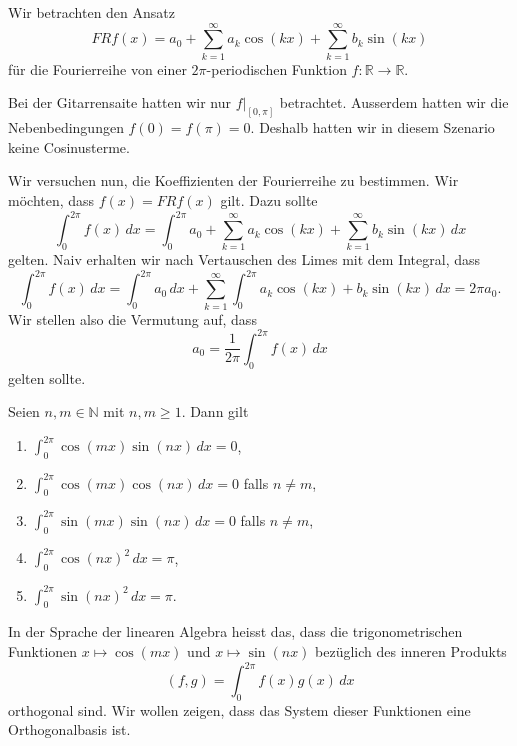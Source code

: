 \documentclass[../main.tex]{subfiles}
\begin{document}
Wir betrachten den Ansatz
\[
  FR f(x) = a_0 + \sum_{k=1}^{\infty} a_k \cos(kx)
  + \sum_{k=1}^{\infty} b_k \sin(kx)
\]
für die Fourierreihe von einer
$2\pi$-periodischen Funktion $f \colon \mathbb{R} \to \mathbb{R}$.

\begin{remark}
  Bei der Gitarrensaite hatten wir nur
  $f|_{[0, \pi]}$ betrachtet. Ausserdem hatten wir die
  Nebenbedingungen $f(0) = f(\pi) = 0$.
  Deshalb hatten wir in diesem Szenario keine Cosinusterme.
\end{remark}

Wir versuchen nun, die Koeffizienten der Fourierreihe zu bestimmen.
Wir möchten, dass $f(x) = FR f(x)$ gilt. Dazu sollte
\[
  \int_{0}^{2\pi} f(x) \, dx 
  = \int_{0}^{2\pi} a_0 +  \sum_{k=1}^{\infty} a_k \cos(kx)
  + \sum_{k=1}^{\infty} b_k \sin(kx)
  \, dx
\]
gelten. Naiv erhalten wir nach Vertauschen des Limes mit dem Integral, dass
\[
  \int_{0}^{2\pi} f(x) \, dx =
  \int_{0}^{2\pi} a_0 \, dx + \sum_{k=1}^{\infty} \int_{0}^{2\pi} a_k \cos (kx)
  + b_k \sin(kx)\, dx = 2\pi a_0.
\]
Wir stellen also die Vermutung auf, dass
\[
  a_0 = \frac{1}{2\pi} \int_{0}^{2\pi} f(x) \, dx
\]
gelten sollte.

\begin{lemma*}
  Seien $n, m \in \mathbb{N}$ mit $n, m \geq 1$.
  Dann gilt
  \begin{enumerate}[\normalfont(i)]
    \item $\int_{0}^{2\pi} \cos(mx) \sin(nx) \, dx = 0$,
    \item $\int_{0}^{2\pi} \cos(mx) \cos(nx) \, dx = 0$ falls $n \neq m$,
    \item $\int_{0}^{2\pi} \sin(mx) \sin(nx) \, dx = 0$ falls $n \neq m$,
    \item $\int_{0}^{2\pi} {\cos(nx)}^2 \, dx = \pi$,
    \item $\int_{0}^{2\pi} {\sin(nx)}^2 \, dx = \pi$.
  \end{enumerate}
\end{lemma*}


In der Sprache der linearen Algebra 
heisst das, dass die trigonometrischen Funktionen
$x \mapsto \cos(mx)$ und $x \mapsto \sin(nx)$
bezüglich des inneren Produkts
\[
  (f, g) = \int_{0}^{2\pi} f(x) g(x) \, dx
\]
orthogonal sind.
Wir wollen zeigen, dass das System dieser Funktionen
eine Orthogonalbasis ist.
\end{document}
